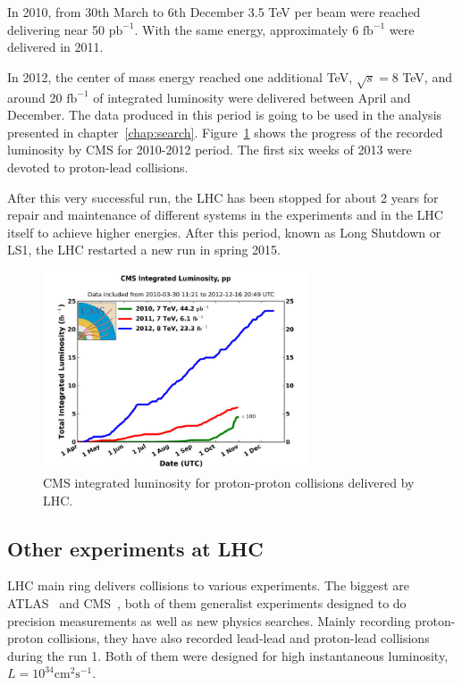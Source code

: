 In 2010, from 30th March to 6th December 3.5 TeV per beam were reached delivering near 50 $\text{pb}^{-1}$. With the same energy, approximately 6 $\text{fb}^{-1}$ were delivered in 2011. 

In 2012, the center of mass energy reached one additional TeV, $\sqrt{s}=8$ TeV, and around 20 $\text{fb}^{-1}$ of integrated luminosity were delivered between April and December. The data produced in this period is going to be used in the analysis presented in chapter~\ref{chap:search}. Figure~\ref{fig:CMSlumi} shows the progress of the recorded luminosity by CMS for 2010-2012 period. The first six weeks of 2013 were devoted to proton-lead collisions.

After this very successful run, the LHC has been stopped for about 2 years for repair and maintenance of different systems in the experiments and in the LHC itself to achieve higher energies. After this period, known as Long Shutdown  or LS1, the LHC restarted a new run in spring 2015.

\begin{figure}[!Hhtbp]
  \begin{center}
    \includegraphics[width=0.7\textwidth]{figs/cms-int-10to12.jpg}
    \caption{CMS integrated luminosity for proton-proton collisions delivered by LHC. }
    \label{fig:CMSlumi}
  \end{center}
\end{figure}

\subsection{Other experiments at LHC}
\label{sec:expers}

LHC main ring delivers collisions to various experiments. The biggest are ATLAS~\cite{ATLAS:1999} and CMS~\cite{Bayatian:922757}, both of them generalist experiments designed to do precision measurements as well as new physics searches. Mainly recording proton-proton collisions, they have also recorded lead-lead and proton-lead collisions during the run 1. Both of them were designed for high instantaneous luminosity, $L = 10^{34}\text{cm}^{2}\text{s}^{-1}$.

